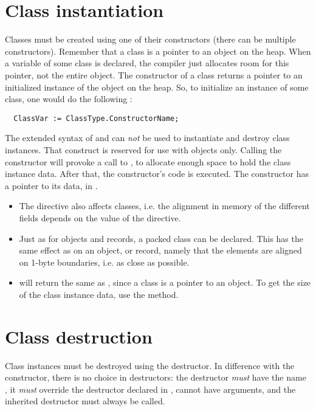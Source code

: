 \section{Class instantiation}
\label{se:classinstantiation}
Classes must be created using one of their constructors (there can be
multiple constructors). Remember that a class is a pointer to an object on
the heap. When a variable of some class is declared, the compiler just 
allocates room for this pointer, not the entire object. The constructor of
a class returns a pointer to an initialized instance of the object on the
heap. So, to initialize an instance of some class, one would do the following :
\begin{verbatim}
  ClassVar := ClassType.ConstructorName;
\end{verbatim}
The extended syntax of  and  can {\em not} be used to
instantiate and destroy class instances.
That construct is reserved for use with objects only.
Calling the constructor will provoke a call to , to allocate
enough space to hold the class instance data.
After that, the constructor's code is executed.
The constructor has a pointer to its data, in .

\begin{remark}
\begin{itemize}
\item The  directive also affects classes,
i.e. the alignment in memory of the different fields depends on the
value of  the  directive.
\item Just as for objects and records, a packed class can be declared.
This has the same effect as on an object, or record, namely that the
elements are aligned on 1-byte boundaries, i.e. as close as possible.
\item {} will return the same as , 
since a class is a pointer to an object. To get the size of the class 
instance data, use the  method.
\end{itemize}
\end{remark}

\section{Class destruction}
Class instances must be destroyed using the destructor. In difference with
the constructor, there is no choice in destructors: the destructor {\em must} 
have the name , it {\em must}  override the  destructor 
declared in , cannot have arguments, and the inherited destructor 
must always be called.

